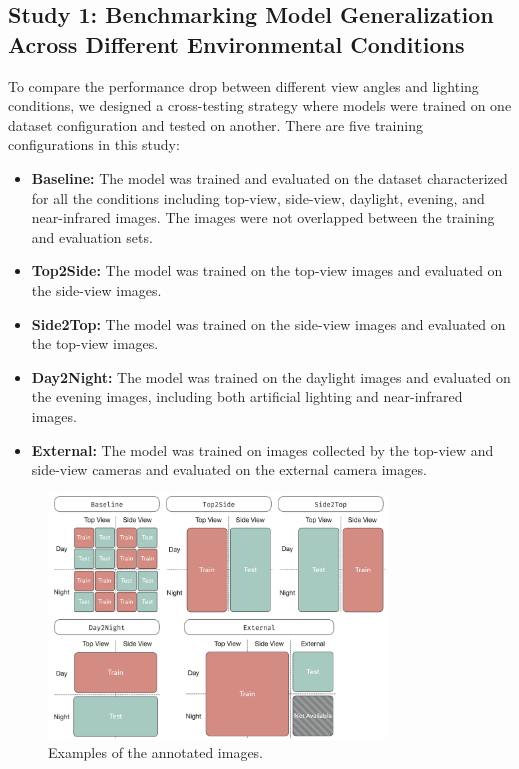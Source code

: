 \subsection*{Study 1: Benchmarking Model Generalization Across Different Environmental Conditions}

To compare the performance drop between different view angles and lighting conditions, we designed a cross-testing strategy where models were trained on one dataset configuration and tested on another. There are five training configurations in this study:

\begin{itemize}
    \item \textbf{Baseline:} The model was trained and evaluated on the dataset characterized for all the conditions including top-view, side-view, daylight, evening, and near-infrared images. The images were not overlapped between the training and evaluation sets.
    \item \textbf{Top2Side:} The model was trained on the top-view images and evaluated on the side-view images.
    \item \textbf{Side2Top:} The model was trained on the side-view images and evaluated on the top-view images.
    \item \textbf{Day2Night:} The model was trained on the daylight images and evaluated on the evening images, including both artificial lighting and near-infrared images.
    \item \textbf{External:} The model was trained on images collected by the top-view and side-view cameras and evaluated on the external camera images.
\end{itemize}


\begin{figure}[h]
    \centering
    \includegraphics[width=0.8\textwidth]{figure_2.jpg}
    \caption{Examples of the annotated images.}
    \label{fig:splits}
\end{figure}

